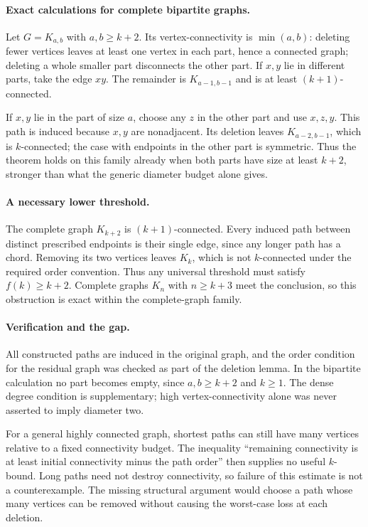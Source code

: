 \documentclass[11pt,a4paper]{article}
\begin{document}
\paragraph{Exact calculations for complete bipartite graphs.}
Let $G=K_{a,b}$ with $a,b\ge k+2$. Its vertex-connectivity is $\min(a,b)$: deleting fewer vertices leaves at least one vertex in each part, hence a connected graph; deleting a whole smaller part disconnects the other part. If $x,y$ lie in different parts, take the edge $xy$. The remainder is $K_{a-1,b-1}$ and is at least $(k+1)$-connected.

If $x,y$ lie in the part of size $a$, choose any $z$ in the other part and use $x,z,y$. This path is induced because $x,y$ are nonadjacent. Its deletion leaves $K_{a-2,b-1}$, which is $k$-connected; the case with endpoints in the other part is symmetric. Thus the theorem holds on this family already when both parts have size at least $k+2$, stronger than what the generic diameter budget alone gives.

\paragraph{A necessary lower threshold.}
The complete graph $K_{k+2}$ is $(k+1)$-connected. Every induced path between distinct prescribed endpoints is their single edge, since any longer path has a chord. Removing its two vertices leaves $K_k$, which is not $k$-connected under the required order convention. Thus any universal threshold must satisfy $f(k)\ge k+2$. Complete graphs $K_n$ with $n\ge k+3$ meet the conclusion, so this obstruction is exact within the complete-graph family.

\paragraph{Verification and the gap.}
All constructed paths are induced in the original graph, and the order condition for the residual graph was checked as part of the deletion lemma. In the bipartite calculation no part becomes empty, since $a,b\ge k+2$ and $k\ge1$. The dense degree condition is supplementary; high vertex-connectivity alone was never asserted to imply diameter two.

For a general highly connected graph, shortest paths can still have many vertices relative to a fixed connectivity budget. The inequality ``remaining connectivity is at least initial connectivity minus the path order'' then supplies no useful $k$-bound. Long paths need not destroy connectivity, so failure of this estimate is not a counterexample. The missing structural argument would choose a path whose many vertices can be removed without causing the worst-case loss at each deletion.
\end{document}
